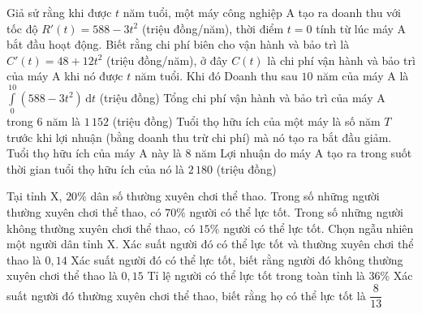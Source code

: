 \begin{ex}%
	Giả sử rằng khi được $t$ năm tuổi, một máy công nghiệp A tạo ra doanh thu với tốc độ $R'(t)=588-3 t^2$ (triệu đồng/năm), thời điểm $t=0$ tính từ lúc máy A bắt đầu hoạt động. Biết rằng chi phí biên cho vận hành và bảo trì là $C'(t)=48+12 t^2$ (triệu đồng/năm), ở đây $C(t)$ là chi phí vận hành và bảo trì của máy A khi nó được $t$ năm tuổi. Khi đó
	\choiceTF
	{\True Doanh thu sau $10$ năm của máy A là $\displaystyle\int\limits_0^{10}\left(588-3 t^2\right) \mathrm{\, d} t$ (triệu đồng)}
	{\True Tổng chi phí vận hành và bảo trì của máy A trong $6$ năm là $1\,152$ (triệu đồng)}
	{Tuổi thọ hữu ích của một máy là số năm $T$ trước khi lợi nhuận (bằng doanh thu trừ chi phí) mà nó tạo ra bắt đầu giảm. Tuổi thọ hữu ích của máy A này là $8$ năm}
	{Lợi nhuận do máy A tạo ra trong suốt thời gian tuổi thọ hữu ích của nó là $2\,180$ (triệu đồng)}
	\end{ex}

\begin{ex}%
	Tại tỉnh X, $20\%$ dân số thường xuyên chơi thể thao. Trong số những người thường xuyên chơi thể thao, có $70\%$ người có thể lực tốt. Trong số những người không thường xuyên chơi thể thao, có $15\%$ người có thể lực tốt. Chọn ngẫu nhiên một người dân tỉnh X.
	\choiceTF
	{\True Xác suất người đó có thể lực tốt và thường xuyên chơi thể thao là $0{,}14$}
	{\True Xác suất người đó có thể lực tốt, biết rằng người đó không thường xuyên chơi thể thao là $0{,}15$}
	{Tỉ lệ người có thể lực tốt trong toàn tỉnh là $36\%$}
	{Xác suất người đó thường xuyên chơi thể thao, biết rằng họ có thể lực tốt là $\dfrac{8}{13}$}
\end{ex}

